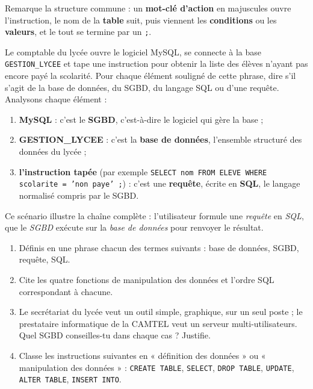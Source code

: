 \documentclass[11pt]{article}
\begin{document}
Remarque la structure commune : un \textbf{mot-clé d'action} en majuscules ouvre l'instruction, le nom de la \textbf{table} suit, puis viennent les \textbf{conditions} ou les \textbf{valeurs}, et le tout se termine par un \texttt{;}.

\begin{exoresolu}
Le comptable du lycée ouvre le logiciel MySQL, se connecte à la base \texttt{GESTION\_LYCEE} et tape une instruction pour obtenir la liste des élèves n'ayant pas encore payé la scolarité. Pour chaque élément souligné de cette phrase, dire s'il s'agit de la base de données, du SGBD, du langage SQL ou d'une requête.
\tcblower
Analysons chaque élément :
\begin{enumerate}
\item \textbf{MySQL} : c'est le \textbf{SGBD}, c'est-à-dire le logiciel qui gère la base ;
\item \textbf{GESTION\_LYCEE} : c'est la \textbf{base de données}, l'ensemble structuré des données du lycée ;
\item \textbf{l'instruction tapée} (par exemple \texttt{SELECT nom FROM ELEVE WHERE scolarite = 'non paye' ;}) : c'est une \textbf{requête}, écrite en \textbf{SQL}, le langage normalisé compris par le SGBD.
\end{enumerate}
Ce scénario illustre la chaîne complète : l'utilisateur formule une \emph{requête} en \emph{SQL}, que le \emph{SGBD} exécute sur la \emph{base de données} pour renvoyer le résultat.
\end{exoresolu}

\begin{exercice}
\begin{enumerate}
\item Définis en une phrase chacun des termes suivants : base de données, SGBD, requête, SQL.
\item Cite les quatre fonctions de manipulation des données et l'ordre SQL correspondant à chacune.
\item Le secrétariat du lycée veut un outil simple, graphique, sur un seul poste ; le prestataire informatique de la CAMTEL veut un serveur multi-utilisateurs. Quel SGBD conseilles-tu dans chaque cas ? Justifie.
\item Classe les instructions suivantes en « définition des données » ou « manipulation des données » : \texttt{CREATE TABLE}, \texttt{SELECT}, \texttt{DROP TABLE}, \texttt{UPDATE}, \texttt{ALTER TABLE}, \texttt{INSERT INTO}.
\end{enumerate}
\end{exercice}
\end{document}
